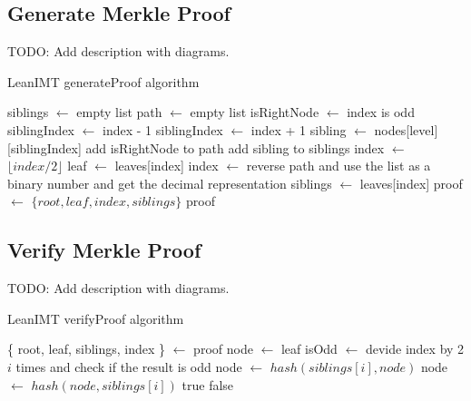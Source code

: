 \documentclass{article}
\begin{document}
\bigbreak

\subsection{Generate Merkle Proof}

TODO: Add description with diagrams.

\bigbreak

\begin{algorithm}[H]
    \caption{LeanIMT generateProof algorithm}\label{generateProof}
    \begin{algorithmic}[1]
        \State siblings $\gets$ empty list
        \State path $\gets$ empty list
        \State isRightNode $\gets$ index is odd
         
        \State siblingIndex $\gets$ index - 1
        \Else {}
        \State siblingIndex $\gets$ index + 1
        \EndIf
        \State sibling $\gets$ nodes[level][siblingIndex]
        \State add isRightNode to path
        \State add sibling to siblings
        \EndIf
        \State index $\gets$ $\lfloor index/2 \rfloor$ 
        \EndFor
        \State leaf $\gets$ leaves[index]
        \State index $\gets$ reverse path and use the list as a binary number and get the decimal representation
        \State siblings $\gets$ leaves[index]
        \State proof $\gets$ $\{root, leaf , index, siblings \}$
        \State \Return proof
        \EndProcedure
    \end{algorithmic}
\end{algorithm}

\bigbreak

\subsection{Verify Merkle Proof}

TODO: Add description with diagrams.

\bigbreak

\begin{algorithm}[H]
    \caption{LeanIMT verifyProof algorithm}\label{verifyProof}
    \begin{algorithmic}[1]
        \State \{ root, leaf, siblings, index \} $\gets$ proof 
        \State node $\gets$ leaf
        \State isOdd $\gets$ devide index by 2 $i$ times and check if the result is odd
         
        \State node $\gets$ $hash(siblings[i], node)$
        \Else {}
        \State node $\gets$ $hash(node, siblings[i])$
        \EndIf
        \EndFor
        \State \Return true
        \Else
        \State \Return false
        \EndIf
        \EndProcedure
    \end{algorithmic}
\end{algorithm}
\end{document}
